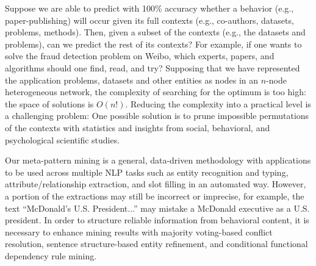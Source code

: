 \documentclass[10.5pt]{article}
\begin{document}
Suppose we are able to predict with 100\% accuracy whether a behavior (e.g., paper-publishing) will occur given its full contexts (e.g., co-authors, datasets, problems, methods). Then, given a subset of the contexts (e.g., the datasets and problems), can we predict the rest of its contexts? For example, if one wants to solve the fraud detection problem on Weibo, which experts, papers, and algorithms should one find, read, and try? Supposing that we have represented the application problems, datasets and other entities as nodes in an $n$-node heterogeneous network, the complexity of searching for the optimum is too high: the space of solutions is $O(n!)$. Reducing the complexity into a practical level is a challenging problem: One possible solution is to prune impossible permutations of the contexts with statistics and insights from social, behavioral, and psychological scientific studies.

\vskip 0.02in

Our meta-pattern mining is a general, data-driven methodology with applications to be used across multiple NLP tasks such as entity recognition and typing, attribute/relationship extraction, and slot filling in an automated way. However, a portion of the extractions may still be incorrect or imprecise, for example, the text ``McDonald's U.S. President...'' may mistake a McDonald executive as a U.S. president. In order to structure reliable information from behavioral content, it is necessary to enhance mining results with majority voting-based conflict resolution, sentence structure-based entity refinement, and conditional functional dependency rule mining.
\end{document}
